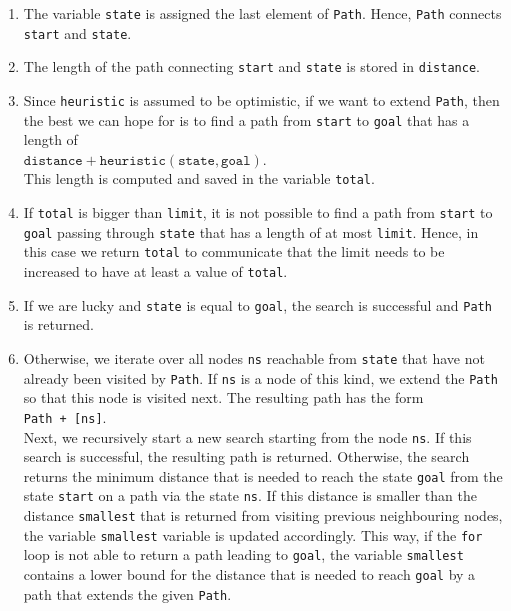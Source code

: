\begin{enumerate}
\item The variable \texttt{state} is assigned the last element of \texttt{Path}.  Hence, \texttt{Path}
      connects \texttt{start} and \texttt{state}.
\item The length of the path connecting \texttt{start} and \texttt{state} is stored in 
      \texttt{distance}.
\item Since \texttt{heuristic} is assumed to be optimistic,  if we want to extend \texttt{Path}, then the best we
      can hope for is to find a path from \texttt{start} to \texttt{goal} that has a length of
      \\[0.2cm]
      \hspace*{1.3cm}
      $\texttt{distance} + \texttt{heuristic}(\texttt{state}, \texttt{goal})$.
      \\[0.2cm]
      This length is computed and saved in the variable \texttt{total}.
\item If \texttt{total} is bigger than \texttt{limit}, it is not possible to find a path from
      \texttt{start} to \texttt{goal} passing through \texttt{state} that has a length of at most
      \texttt{limit}.  Hence, in this case we return \texttt{total} to communicate that the limit needs to
      be increased to have at least a value of \texttt{total}.
\item If we are lucky and \texttt{state} is equal to \texttt{goal}, the search is successful and \texttt{Path}
      is returned. 
\item Otherwise, we iterate over all nodes \texttt{ns} reachable from \texttt{state} that have not already been visited
      by \texttt{Path}.  If \texttt{ns} is a node of this kind, we extend the \texttt{Path} so that
      this node is visited next.  The resulting path has the form
      \\[0.2cm]
      \hspace*{1.3cm}
      \texttt{Path + [ns]}.
      \\[0.2cm]
      Next, we recursively start a new search starting from the node \texttt{ns}.  If this search is
      successful, the resulting path is returned.  Otherwise, the search returns the minimum distance that is
      needed to reach the state \texttt{goal} from the state \texttt{start} on a path via the state
      \texttt{ns}.  If this distance is smaller than the distance \texttt{smallest} that is returned from
      visiting previous neighbouring nodes, the variable \texttt{smallest} variable is updated accordingly.
      This way, if the \texttt{for} loop is not able to return a path leading to \texttt{goal}, the variable
      \texttt{smallest} contains a lower bound for the distance that is needed to reach \texttt{goal} by a path that
      extends the given \texttt{Path}. 


\end{enumerate}
